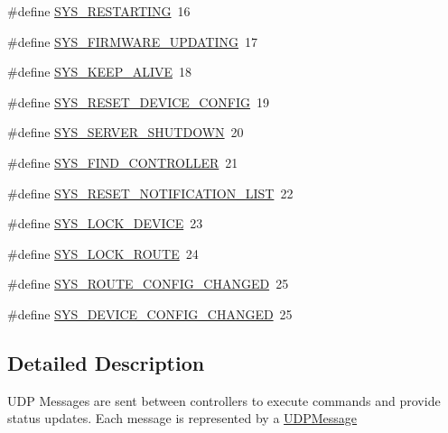 \begin{DoxyCompactItemize}
\item 
\#define \hyperlink{group___u_d_p_message_i_d_ga9ed42f3a7fcc253fa49ce8ff33a75422}{S\+Y\+S\+\_\+\+R\+E\+S\+T\+A\+R\+T\+I\+NG}~16
\item 
\#define \hyperlink{group___u_d_p_message_i_d_ga122f4ab16a4cf3e2dd8b80e02158963d}{S\+Y\+S\+\_\+\+F\+I\+R\+M\+W\+A\+R\+E\+\_\+\+U\+P\+D\+A\+T\+I\+NG}~17
\item 
\#define \hyperlink{group___u_d_p_message_i_d_ga596f44c285ab391c72addd0e803b0fc4}{S\+Y\+S\+\_\+\+K\+E\+E\+P\+\_\+\+A\+L\+I\+VE}~18
\item 
\#define \hyperlink{group___u_d_p_message_i_d_gaef042a9ee57e8ddf94286a3263734468}{S\+Y\+S\+\_\+\+R\+E\+S\+E\+T\+\_\+\+D\+E\+V\+I\+C\+E\+\_\+\+C\+O\+N\+F\+IG}~19
\item 
\#define \hyperlink{group___u_d_p_message_i_d_ga3021efce231e9a711d6f498630327086}{S\+Y\+S\+\_\+\+S\+E\+R\+V\+E\+R\+\_\+\+S\+H\+U\+T\+D\+O\+WN}~20
\item 
\#define \hyperlink{group___u_d_p_message_i_d_gadfda0e5a5a6a08de555dd55182a4cd87}{S\+Y\+S\+\_\+\+F\+I\+N\+D\+\_\+\+C\+O\+N\+T\+R\+O\+L\+L\+ER}~21
\item 
\#define \hyperlink{group___u_d_p_message_i_d_gab96f76ffa1af60bebfd871ca1e7c4a08}{S\+Y\+S\+\_\+\+R\+E\+S\+E\+T\+\_\+\+N\+O\+T\+I\+F\+I\+C\+A\+T\+I\+O\+N\+\_\+\+L\+I\+ST}~22
\item 
\#define \hyperlink{group___u_d_p_message_i_d_ga42644954a92421cfe92c2e3d20f795ce}{S\+Y\+S\+\_\+\+L\+O\+C\+K\+\_\+\+D\+E\+V\+I\+CE}~23
\item 
\#define \hyperlink{group___u_d_p_message_i_d_ga9ba07526db57f9ec44d01fe3eba9cc60}{S\+Y\+S\+\_\+\+L\+O\+C\+K\+\_\+\+R\+O\+U\+TE}~24
\item 
\#define \hyperlink{group___u_d_p_message_i_d_ga9ea6e4272668196e99cdeb3c63652937}{S\+Y\+S\+\_\+\+R\+O\+U\+T\+E\+\_\+\+C\+O\+N\+F\+I\+G\+\_\+\+C\+H\+A\+N\+G\+ED}~25
\item 
\#define \hyperlink{group___u_d_p_message_i_d_ga777463f710ba53ab3b9bce0042ae93e5}{S\+Y\+S\+\_\+\+D\+E\+V\+I\+C\+E\+\_\+\+C\+O\+N\+F\+I\+G\+\_\+\+C\+H\+A\+N\+G\+ED}~25
\end{DoxyCompactItemize}


\subsection{Detailed Description}
U\+DP Messages are sent between controllers to execute commands and provide status updates. Each message is represented by a \hyperlink{class_u_d_p_message}{U\+D\+P\+Message} 

